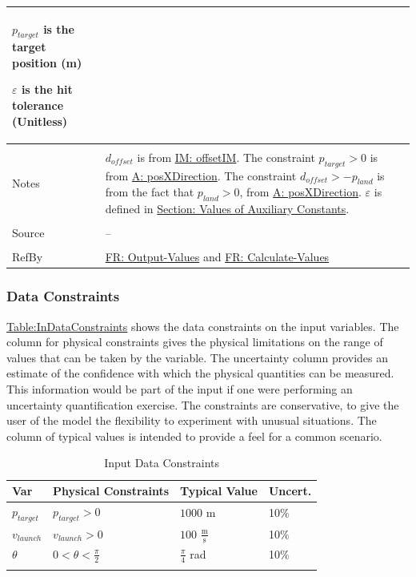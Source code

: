 \documentclass[12pt]{article}
\begin{document}
\begin{minipage}{\textwidth}
\begin{tabular}{>{\raggedright}p{}>{\raggedright\arraybackslash}p{}}
\begin{symbDescription}
                        \item{${p_{target}}$ is the target position (m)}
                        \item{$ε$ is the hit tolerance (Unitless)}
                        \end{symbDescription}
          \\ \midrule \\
          Notes & ${d_{offset}}$ is from \hyperref[IM:offsetIM]{IM: offsetIM}.
                  The constraint ${p_{target}}>0$ is from \hyperref[posXDirection]{A: posXDirection}.
                  The constraint ${d_{offset}}>-{p_{land}}$ is from the fact that ${p_{land}}>0$, from \hyperref[posXDirection]{A: posXDirection}.
                  $ε$ is defined in \hyperref[Sec:AuxConstants]{Section: Values of Auxiliary Constants}.
          \\ \midrule \\
          Source & --
          \\ \midrule \\
          RefBy & \hyperref[outputValues]{FR: Output-Values} and \hyperref[calcValues]{FR: Calculate-Values}
          \\ \bottomrule
          \end{tabular}
          \end{minipage}
\subsubsection{Data Constraints}
\label{Sec:DataConstraints}
\hyperref[Table:InDataConstraints]{Table:InDataConstraints} shows the data constraints on the input variables. The column for physical constraints gives the physical limitations on the range of values that can be taken by the variable. The uncertainty column provides an estimate of the confidence with which the physical quantities can be measured. This information would be part of the input if one were performing an uncertainty quantification exercise. The constraints are conservative, to give the user of the model the flexibility to experiment with unusual situations. The column of typical values is intended to provide a feel for a common scenario.
\begin{longtable}{l l l l}
\toprule
\textbf{Var} & \textbf{Physical Constraints} & \textbf{Typical Value} & \textbf{Uncert.}
\\
\midrule
\endhead
${p_{target}}$ & ${p_{target}}>0$ & $1000$ m & 10$\%$
\\
${v_{launch}}$ & ${v_{launch}}>0$ & $100$ $\frac{\text{m}}{\text{s}}$ & 10$\%$
\\
$θ$ & $0<θ<\frac{π}{2}$ & $\frac{π}{4}$ rad & 10$\%$
\\
\bottomrule
\caption{Input Data Constraints}
\label{Table:InDataConstraints}
\end{longtable}
\end{document}
